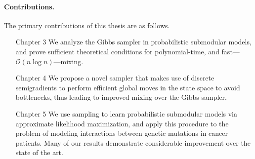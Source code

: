 \newpage
\paragraph{Contributions.} The primary contributions of this thesis are as follows.
\begin{itemize}[leftmargin=3.5em]
\item[\textsf{Chapter 3}] We analyze the Gibbs sampler in probabilistic submodular models, and prove sufficient theoretical conditions for polynomial-time, and fast---$\mathcal{O}(n\log n)$---mixing.
\item[\textsf{Chapter 4}] We propose a novel sampler that makes use of discrete semigradients to perform efficient global moves in the state space to avoid bottlenecks, thus leading to improved mixing over the Gibbs sampler.
\item[\textsf{Chapter 5}] We use sampling to learn probabilistic submodular models via approximate likelihood maximization, and apply this procedure to the problem of modeling interactions between genetic mutations in cancer patients.
Many of our results demonstrate considerable improvement over the state of the art.
\end{itemize}